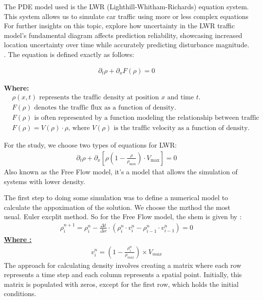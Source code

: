 \documentclass{article}
\begin{document}
		The PDE model used is the LWR  (Lighthill-Whitham-Richards) equation system. This system allows us to simulate car traffic using more or less complex equations For further insights on this topic, explore how uncertainty in the LWR traffic model's fundamental diagram affects prediction reliability, showcasing increased location uncertainty over time while accurately predicting disturbance magnitude. \cite{article}. The equation is defined exactly as follows:
		
		\begin{align*}
			\boxed{\partial_t\rho + \partial_xF(\rho)=0}
		\end{align*}
		
		\textbf{Where:}
		\begin{align*}
			& \rho(x,t) \text{ represents the traffic density at position } x \text{ and time } t. \\
			& F(\rho) \text{ denotes the traffic flux as a function of density.} \\
			& F(\rho) \text{ is often represented by a function modeling the relationship between traffic density and traffic velocity.} \\
			& F(\rho) = V(\rho) \cdot \rho \text{, where } V(\rho) \text{ is the traffic velocity as a function of density.}
		\end{align*}
		
		For the study, we choose two types of equations for LWR:
		\begin{align}
			\partial_t\rho + \partial_x\left[ \rho\left( 1-\frac{\rho}{\rho_{\text{max}}}\right) \cdot V_{\text{max}}\right] = 0 
		\end{align}
		Also known as the Free Flow model, it's a model that allows the simulation of systems with lower density.
		
		
		
		The first step to doing some simulation was to define a numerical model to calculate the appoximation of the solution.
		We choose the mzthod the most usual. Euler excplit method.
		So for the Free Flow model, the shem is given by : 
		\begin{align*}
			\boxed{\rho_{i}^{n+1} = \rho_i^n - \frac{\Delta t}{\Delta x} \cdot \left(\rho_i^n \cdot v_i^n - \rho_{i-1}^n \cdot v_{i-1}^n \right)
				=0}
		\end{align*}
		\textbf{\underline{Where : }}
		\begin{align*}
			\boxed{v_i^n = \left( 1 - \frac{\rho_i^n}{\rho_{max}}\right)  \times V_{max}}
		\end{align*}
		\newpage
		The approach for calculating density involves creating a matrix where each row represents a time step and each column represents a spatial point. Initially, this matrix is populated with zeros, except for the first row, which holds the initial conditions.
		
\end{document}
